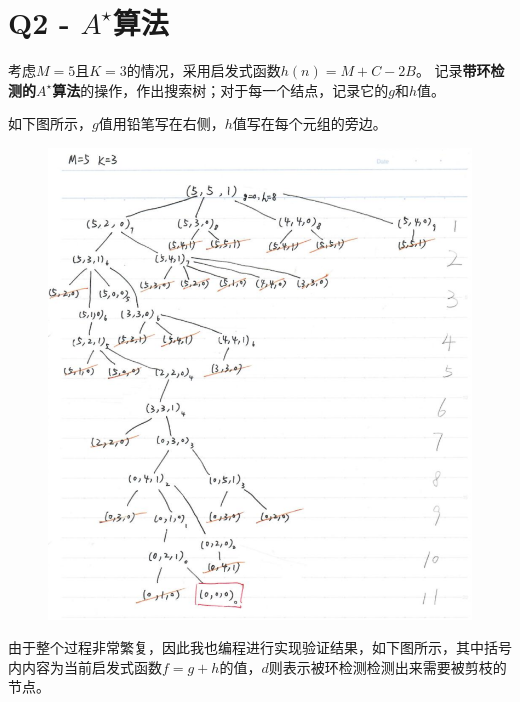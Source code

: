 \documentclass[a4paper, 11pt]{article}
\begin{document}
\newpage
\section{Q2 - $A^\star$算法}
\begin{question}[传教士与野人问题]
考虑$M=5$且$K=3$的情况，采用启发式函数$h(n)=M+C-2B$。
记录\textbf{带环检测的$A^\star$算法}的操作，作出搜索树；对于每一个结点，记录它的$g$和$h$值。
\end{question}
\begin{answer}
如下图所示，$g$值用铅笔写在右侧，$h$值写在每个元组的旁边。
\begin{figure}[H]
\centering
\includegraphics[width=\linewidth]{fig/A2-1.png}
\end{figure}
由于整个过程非常繁复，因此我也编程进行实现验证结果，如下图所示，其中括号内内容为当前启发式函数$f=g+h$的值，$d$则表示被环检测检测出来需要被剪枝的节点。
\begin{figure}[H]
\centering

\end{figure}
\end{answer}
\end{document}

